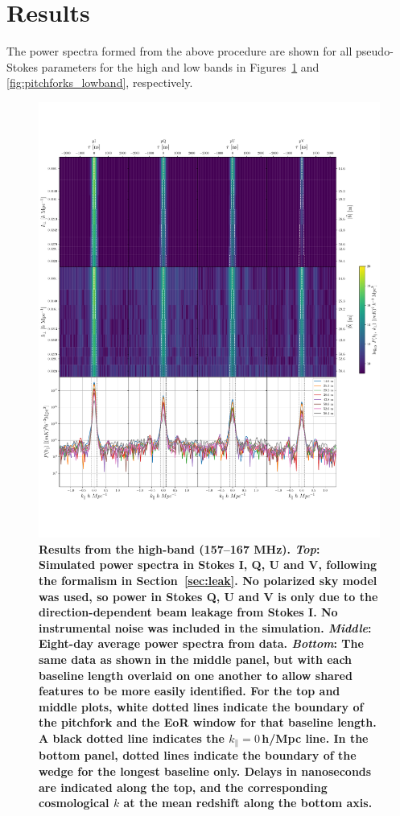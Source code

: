 \documentclass[twocolumn, trackchanges]{aastex61}
\newcommand{\edited}[1]{{\bf \color{blue} #1}}
\begin{document}
{\section{Results}
\label{sec:results}

The power spectra formed from the above procedure are shown for all pseudo-Stokes parameters for the high and low bands in Figures~\ref{fig:pitchforks_highband} and \ref{fig:pitchforks_lowband}, respectively.   

\begin{figure}[h]
\centering
\includegraphics[scale=0.45]{highband_8day_LST_105_230.pdf}
\caption{\edited{Results from the high-band (157--167 MHz).  \textit{Top}: Simulated power spectra in Stokes I, Q, U and V, following the formalism in Section~\ref{sec:leak}.  No polarized sky model was used, so power in Stokes Q, U and V is only due to the direction-dependent beam leakage from Stokes I.  No instrumental noise was included in the simulation. \textit{Middle}: Eight-day average power spectra from data. \textit{Bottom}: The same data as shown in the middle panel, but with each baseline length overlaid on one another to allow shared features to be more easily identified.  For the top and middle plots, white dotted lines indicate the boundary of the pitchfork and the EoR window for that baseline length. A black dotted line indicates the $k_{\parallel}=0$\,h/Mpc line.  In the bottom panel, dotted lines indicate the boundary of the wedge for the longest baseline only.  Delays in nanoseconds are indicated along the top, and the corresponding cosmological $k$ at the mean redshift along the bottom axis.}
}
\label{fig:pitchforks_highband}
\end{figure}

}
\end{document}
